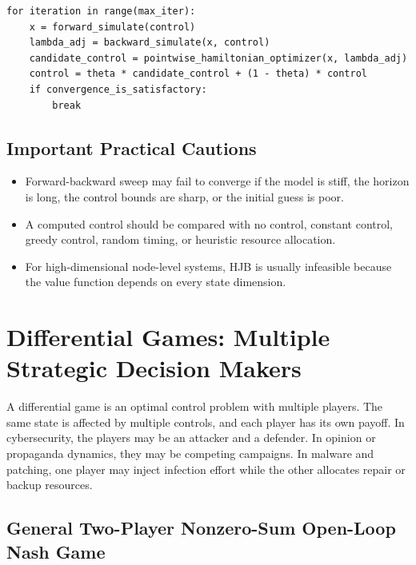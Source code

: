 \documentclass[11pt,a4paper]{article}
\begin{document}
\begin{lstlisting}[caption={Forward-backward sweep pseudocode.}]
for iteration in range(max_iter):
    x = forward_simulate(control)
    lambda_adj = backward_simulate(x, control)
    candidate_control = pointwise_hamiltonian_optimizer(x, lambda_adj)
    control = theta * candidate_control + (1 - theta) * control
    if convergence_is_satisfactory:
        break
\end{lstlisting}

\subsection{Important Practical Cautions}

\begin{itemize}
  \item Forward-backward sweep may fail to converge if the model is stiff, the horizon is long, the control bounds are sharp, or the initial guess is poor.
  \item A computed control should be compared with no control, constant control, greedy control, random timing, or heuristic resource allocation.
  \item For high-dimensional node-level systems, HJB is usually infeasible because the value function depends on every state dimension.
\end{itemize}

\section{Differential Games: Multiple Strategic Decision Makers}

A differential game is an optimal control problem with multiple players. The same state is affected by multiple controls, and each player has its own payoff. In cybersecurity, the players may be an attacker and a defender. In opinion or propaganda dynamics, they may be competing campaigns. In malware and patching, one player may inject infection effort while the other allocates repair or backup resources.

\subsection{General Two-Player Nonzero-Sum Open-Loop Nash Game}
\end{document}
